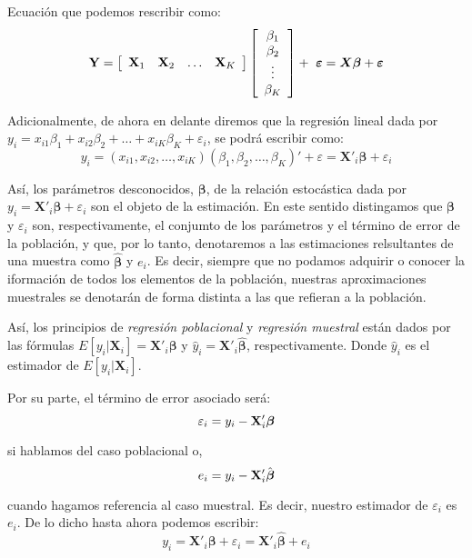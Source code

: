 \documentclass[
  a4paper,
]{article}
\begin{document}
Ecuación que podemos rescribir como: \[
\mathbf{Y} 
=
\left[ 
\begin{array}{c c c c}
\mathbf{X}_1 & \mathbf{X}_2 & \ldots & \mathbf{X}_K 
\end{array} 
\right]
\left[ 
\begin{array}{c}
\beta_1 \\
\beta_2 \\
\vdots \\
\beta_K 
\end{array} 
\right]
+
\
\boldsymbol{\varepsilon}
= 
\boldsymbol{X\beta} + \boldsymbol{\varepsilon}
\]

Adicionalmente, de ahora en delante diremos que la regresión lineal dada
por
\(y_i = x_{i1}\beta_1 + x_{i2}\beta_2 + \ldots + x_{iK}\beta_K + \varepsilon_i\),
se podrá escribir como: \[
y_i = (x_{i1}, x_{i2}, \ldots, x_{iK})(\beta_1, \beta_2, \ldots, \beta_K)' + \varepsilon = \mathbf{X}'_i \boldsymbol{\beta} + \varepsilon_i
\]

Así, los parámetros desconocidos, \(\boldsymbol{\beta}\), de la relación
estocástica dada por
\(y_i = \mathbf{X}'_i \boldsymbol{\beta} + \varepsilon_i\) son el objeto
de la estimación. En este sentido distingamos que \(\boldsymbol{\beta}\)
y \(\varepsilon_i\) son, respectivamente, el conjumto de los parámetros
y el término de error de la población, y que, por lo tanto, denotaremos
a las estimaciones relsultantes de una muestra como
\(\hat{\boldsymbol{\beta}}\) y \(e_i\). Es decir, siempre que no podamos
adquirir o conocer la iformación de todos los elementos de la población,
nuestras aproximaciones muestrales se denotarán de forma distinta a las
que refieran a la población.

Así, los principios de \textit{regresión poblacional} y
\textit{regresión muestral} están dados por las fórmulas
\(E[y_i|\mathbf{X}_i] = \mathbf{X}'_i\boldsymbol{\beta}\) y
\(\hat{y}_i = \mathbf{X}'_i\hat{\boldsymbol{\beta}}\), respectivamente.
Donde \(\hat{y}_i\) es el estimador de \(E[y_i|\mathbf{X}_i]\).

Por su parte, el término de error asociado será: \[
\varepsilon_i = y_i - {\bf{X}}'_i \boldsymbol{\beta}
\]

si hablamos del caso poblacional o, \[
e_i = y_i - {\bf{X}}'_i \hat{\boldsymbol{\beta}}
\]

cuando hagamos referencia al caso muestral. Es decir, nuestro estimador
de \(\varepsilon_i\) es \(e_i\). De lo dicho hasta ahora podemos
escribir: \[
y_i = \mathbf{X}'_i \boldsymbol{\beta} + \varepsilon_i = \mathbf{X}'_i \hat{\boldsymbol{\beta}} + e_i
\]
\end{document}
